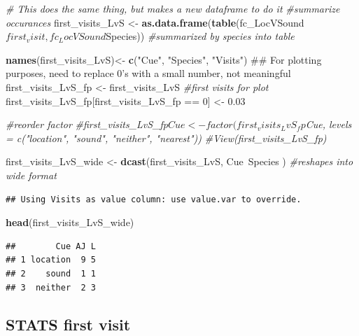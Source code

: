 \documentclass[]{article}
\newenvironment{Shaded}{\begin{snugshade}}{\end{snugshade}}
\newcommand{\KeywordTok}[1]{\textcolor[rgb]{0.13,0.29,0.53}{\textbf{{#1}}}}
\newcommand{\DecValTok}[1]{\textcolor[rgb]{0.00,0.00,0.81}{{#1}}}
\newcommand{\FloatTok}[1]{\textcolor[rgb]{0.00,0.00,0.81}{{#1}}}
\newcommand{\StringTok}[1]{\textcolor[rgb]{0.31,0.60,0.02}{{#1}}}
\newcommand{\CommentTok}[1]{\textcolor[rgb]{0.56,0.35,0.01}{\textit{{#1}}}}
\newcommand{\NormalTok}[1]{{#1}}
\begin{document}
\begin{Shaded}
\begin{Highlighting}[]
\CommentTok{# This does the same thing, but makes a new dataframe to do it}
\CommentTok{#summarize occurances}
\NormalTok{first_visits_LvS <-}\StringTok{ }\KeywordTok{as.data.frame}\NormalTok{(}\KeywordTok{table}\NormalTok{(fc_LocVSound$first_visit, fc_LocVSound$Species)) }\CommentTok{#summarized by species into table}



\KeywordTok{names}\NormalTok{(first_visits_LvS)<-}\StringTok{ }\KeywordTok{c}\NormalTok{(}\StringTok{"Cue"}\NormalTok{, }\StringTok{"Species"}\NormalTok{, }\StringTok{"Visits"}\NormalTok{)}
\NormalTok{## For plotting purposes, need to replace 0's with a small number, not meaningful}
 \NormalTok{first_visits_LvS_fp <-}\StringTok{ }\NormalTok{first_visits_LvS }\CommentTok{#first visits for plot}
 \NormalTok{first_visits_LvS_fp[first_visits_LvS_fp ==}\StringTok{ }\DecValTok{0}\NormalTok{] <-}\StringTok{ }\FloatTok{0.03} 
 
 \CommentTok{#reorder factor}
\CommentTok{#first_visits_LvS_fp$Cue<- factor(first_visits_LvS_fp$Cue, levels = c("location", "sound", "neither", "nearest"))}
\CommentTok{#View(first_visits_LvS_fp)}

\NormalTok{first_visits_LvS_wide <-}\StringTok{ }\KeywordTok{dcast}\NormalTok{(first_visits_LvS, Cue~Species ) }\CommentTok{#reshapes into wide format}
\end{Highlighting}
\end{Shaded}

\begin{verbatim}
## Using Visits as value column: use value.var to override.
\end{verbatim}

\begin{Shaded}
\begin{Highlighting}[]
\KeywordTok{head}\NormalTok{(first_visits_LvS_wide)}
\end{Highlighting}
\end{Shaded}

\begin{verbatim}
##        Cue AJ L
## 1 location  9 5
## 2    sound  1 1
## 3  neither  2 3
\end{verbatim}

\subsection{STATS first visit}\label{stats-first-visit}
\end{document}
